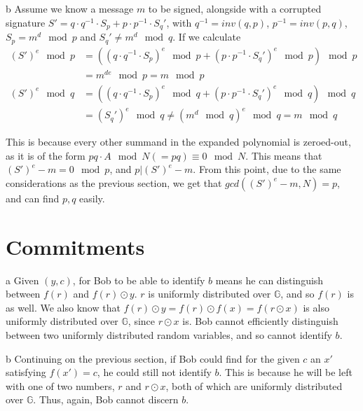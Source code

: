 \documentclass{article}
\begin{document}
\begin{paragraph}
    b Assume we know a message \(m\) to be signed, alongside with a corrupted signature \(S' = q \cdot q^{-1} \cdot S_p + p \cdot p^{-1} \cdot S_q'\), with \(q^{-1} = inv(q, p)\), \(p^{-1} = inv(p, q)\), \(S_p = m^d \mod{p}\) and \(S_q' \neq m^d \mod{q}\). If we calculate
    \begin{align*}
        {(S')}^e \mod{p} &= \left({\left(q \cdot q^{-1} \cdot S_p\right)}^e \mod{p} + {\left(p \cdot p^{-1} \cdot S_q'\right)}^e \mod{p}\right) \mod{p}\\
        &= m^{de} \mod{p} = m \mod{p}\\
        {(S')}^e \mod{q} &= \left({\left(q \cdot q^{-1} \cdot S_p\right)}^e \mod{q} + {\left(p \cdot p^{-1} \cdot S_q'\right)}^e \mod{q}\right) \mod{q}\\
        &= \left(S_q'\right)^{e} \mod{q} \neq {\left(m^d \mod{q}\right)}^e \mod{q} = m \mod{q}
    \end{align*}
    
    This is because every other summand in the expanded polynomial is zeroed-out, as it is of the form \(pq \cdot A \mod{N( = pq)} \equiv 0 \mod{N}\). This means that \(\left(S'\right)^e - m = 0 \mod{p}\), and \(p|\left(S'\right)^e - m\). From this point, due to the same considerations as the previous section, we get that \(gcd(\left(S'\right)^e - m, N) = p\), and can find \(p, q\) easily.
\end{paragraph}

\section{Commitments}
\begin{paragraph}
    a Given \((y, c)\), for Bob to be able to identify \(b\) means he can distinguish between \(f(r)\) and \(f(r) \odot y\). \(r\) is uniformly distributed over \(\mathbb{G}\), and so \(f(r)\) is as well. We also know that \(f(r) \odot y = f(r) \odot f(x) = f(r \odot x)\) is also uniformly distributed over \(\mathbb{G}\), since \(r \odot x\) is. Bob cannot efficiently distinguish between two uniformly distributed random variables, and so cannot identify \(b\).
\end{paragraph}

\begin{paragraph}
    b Continuing on the previous section, if Bob could find for the given \(c\) an \(x'\) satisfying \(f(x') = c\), he could still not identify \(b\). This is because he will be left with one of two numbers, \(r\) and \(r \odot x\), both of which are uniformly distributed over \(\mathbb{G}\). Thus, again, Bob cannot discern \(b\).
\end{paragraph}
\end{document}
